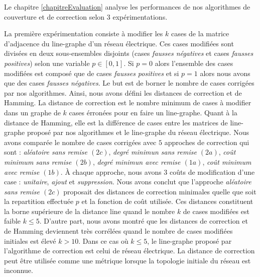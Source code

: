 Le chapitre \ref{chapitreEvaluation} analyse les performances de nos algorithmes de couverture et de correction selon $3$ exp\'erimentations. 

La premi\`ere exp\'erimentation consiste \`a modifier les $k$ cases de la matrice d'adjacence du line-graphe d'un r\'eseau \'electrique. Ces cases modifi\'ees sont divis\'ees en deux sous-ensembles disjoints (cases {\em fausses n\'egatives} et cases {\em fausses positives}) selon une variable $p \in [0,1]$. Si $p = 0$ alors l'ensemble des cases modifi\'ees est compos\'e que de cases  {\em fausses positives} et si $p=1$ alors nous avons que des cases {\em fausses n\'egatives}. 
Le but est de borner le nombre de cases corrig\'ees par nos algorithmes.
Ainsi, nous avons d\'efini les distances de correction et de Hamming. 
La distance de correction est le nombre minimum de cases \`a modifier dans un graphe de $k$ cases \'erron\'ees pour en faire un line-graphe. 
Quant \`a la distance de Hamming, elle est la diff\'erence de cases entre les matrices de line-graphe propos\'e par nos algorithmes et le line-graphe du r\'eseau \'electrique.
Nous avons compar\'ee le nombre de cases corrig\'ees avec $5$ approches de correction qui sont : {\em al\'eatoire sans remise $(2c)$}, {\em degr\'e minimun sans remise $(2a)$}, {\em co\^ut minimum sans remise $(2b)$}, {\em degr\'e minimun avec remise $(1a)$}, {\em co\^ut minimum avec remise $(1b)$}. \`A chaque approche, nous avons $3$ co\^uts de modification  d'une case : {\em unitaire}, {\em ajout} et {\em suppression}.
Nous avons conclut que l'approche  {\em al\'eatoire sans remise $(2c)$} proposait des distances de correction minimales quelle que soit la repartition effectu\'ee $p$ et la fonction de co\^ut utilis\'ee. Ces distances constituent la borne sup\'erieure de la distance line quand le nombre $k$ de cases modifi\'ees est faible $k \le 5$. 
D'autre part, nous avons montr\'e que les distances de correction et de Hamming deviennent tr\`es corr\'el\'ees quand le nombre de cases modifi\'ees initiales est \'elev\'e $k > 10$. Dans ce cas o\`u $k \le 5$, le line-graphe propos\'e par l'algorithme de correction est celui de r\'eseau \'electrique. La distance de correction peut \^etre utilis\'ee comme une m\'etrique lorsque la topologie initiale du r\'eseau est inconnue.
\newline

